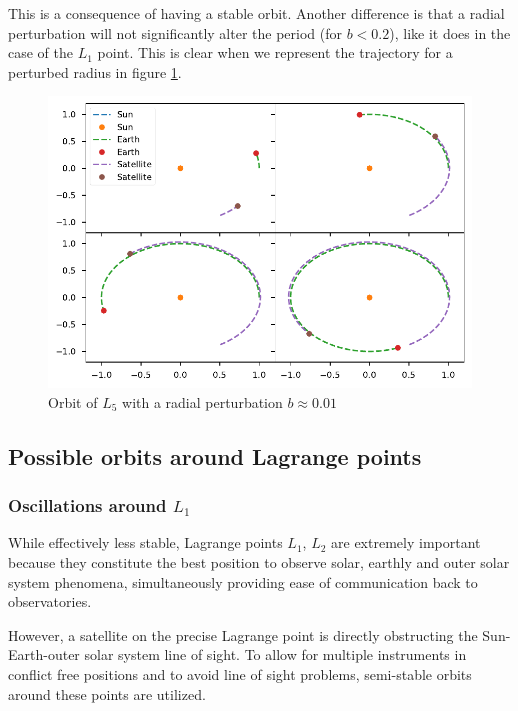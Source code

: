 \documentclass{aa}
\begin{document}
This is a consequence of having a stable orbit. Another difference is that a
radial perturbation will not significantly alter the period (for $b <
0.2$), like it does in the case of the $L_1$ point. This is clear when we
represent the trajectory for a perturbed radius in figure \ref{fig:l5_perturbed_orb}.

\begin{figure}
  \centering
  \includegraphics[width=\linewidth]{figs/l5_pert_orbit.pdf}
  \caption{Orbit of $L_5$ with a radial perturbation $b \approx 0.01$}
  \label{fig:l5_perturbed_orb}
\end{figure}

\subsection{Possible orbits around Lagrange points}

\subsubsection{Oscillations around $L_1$}

While effectively less stable, Lagrange points $L_1$, $L_2$ are extremely
important because they constitute the best position to observe solar, earthly
and outer solar system phenomena, simultaneously providing ease of communication
back to observatories.

However, a satellite on the precise Lagrange point is directly obstructing the
Sun-Earth-outer solar system line of sight. To allow for multiple instruments in
conflict free positions and to avoid line of sight problems, semi-stable orbits
around these points are utilized.
\end{document}
